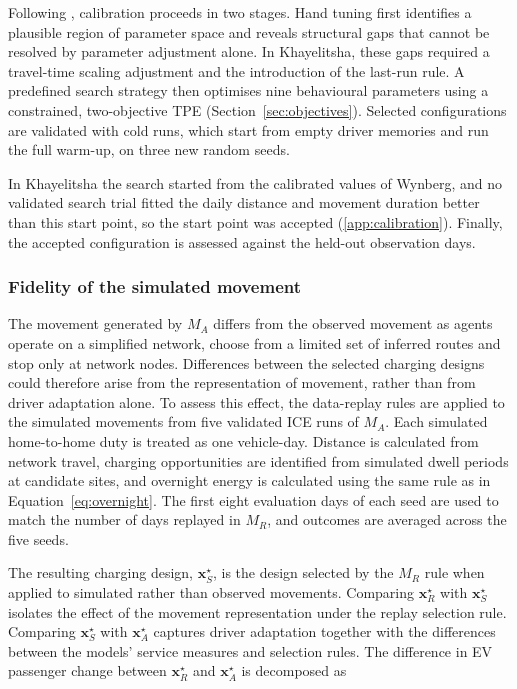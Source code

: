 \documentclass{elsarticle}
\newcommand{\MR}{\ensuremath{M_R}}
\newcommand{\MA}{\ensuremath{M_A}}
\newcommand{\xR}{\ensuremath{\mathbf{x}_R^{\star}}}
\newcommand{\xA}{\ensuremath{\mathbf{x}_A^{\star}}}
\newcommand{\xS}{\ensuremath{\mathbf{x}_S^{\star}}}
\begin{document}
Following \citet{thiele2014_abm_parameter_estimation}, calibration proceeds in two stages. Hand tuning first identifies a plausible region of parameter space and reveals structural gaps that cannot be resolved by parameter adjustment alone. In Khayelitsha, these gaps required a travel-time scaling adjustment and the introduction of the last-run rule. A predefined search strategy then optimises nine behavioural parameters using a constrained, two-objective TPE (Section~\ref{sec:objectives}). Selected configurations are validated with cold runs, which start from empty driver memories and run the full warm-up, on three new random seeds.

In Khayelitsha the search started from the calibrated values of Wynberg, and no validated search trial fitted the daily distance and movement duration better than this start point, so the start point was accepted (\ref{app:calibration}). Finally, the accepted configuration is assessed against the held-out observation days. 

\subsubsection{Fidelity of the simulated movement}
\label{sec:representation}

The movement generated by \(\MA\) differs from the observed movement as agents operate on a simplified network, choose from a limited set of inferred routes and stop only at network nodes. Differences between the selected charging designs could therefore arise from the representation of movement, rather than from driver adaptation alone. To assess this effect, the data-replay rules are applied to the simulated movements from five validated ICE runs of \(\MA\). Each simulated home-to-home duty is treated as one vehicle-day. Distance is calculated from network travel, charging opportunities are identified from simulated dwell periods at candidate sites, and overnight energy is calculated using the same rule as in Equation~\eqref{eq:overnight}. The first eight evaluation days of each seed are used to match the number of days replayed in \(\MR\), and outcomes are averaged across the five seeds.

The resulting charging design, \(\xS\), is the design selected by the \(\MR\) rule when applied to simulated rather than observed movements. Comparing \(\xR\) with \(\xS\) isolates the effect of the movement representation under the replay selection rule. Comparing \(\xS\) with \(\xA\) captures driver adaptation together with the differences between the models' service measures and selection rules. The difference in EV passenger change between \(\xR\) and \(\xA\) is decomposed as
\end{document}

